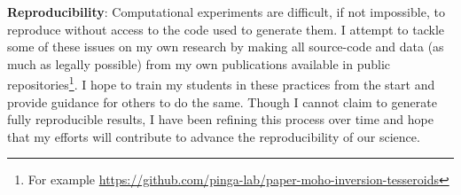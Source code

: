 \documentclass[12pt]{article}
\begin{document}
\textbf{Reproducibility}:
Computational experiments
are difficult, if not impossible, to reproduce
without access to the code used to generate them.
%
I attempt to tackle
some of these issues
on my own research
by making all source-code and data
(as much as legally possible)
from my own publications
available in public repositories\footnote{For example \url{https://github.com/pinga-lab/paper-moho-inversion-tesseroids}}.
%
I hope to train my students
in these practices from the start
and provide guidance for others to do the same.
%
Though I cannot claim
to generate fully reproducible results,
I have been refining this process over time
and hope that my efforts will contribute
to advance the reproducibility of our science.
\end{document}
